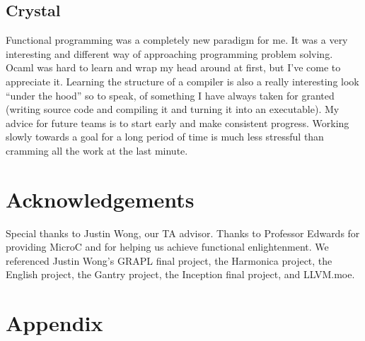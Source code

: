 \documentclass[12pt]{article}
\begin{document}
\subsection{Crystal}
Functional programming was a completely new paradigm for me. It was a very interesting and different way of approaching programming problem solving. Ocaml was hard to learn and wrap my head around at first, but I've come to appreciate it. Learning the structure of a compiler is also a really interesting look ``under the hood'' so to speak, of something I have always taken for granted (writing source code and compiling it and turning it into an executable). My advice for future teams is to start early and make consistent progress. Working slowly towards a goal for a long period of time is much less stressful than cramming all the work at the last minute.

\section{Acknowledgements}
Special thanks to Justin Wong, our TA advisor. Thanks to Professor Edwards for providing MicroC and for helping us achieve functional enlightenment. We referenced Justin Wong's GRAPL final project, the Harmonica project, the English project, the Gantry project, the Inception final project, and LLVM.moe.

\section{Appendix}
\end{document}
